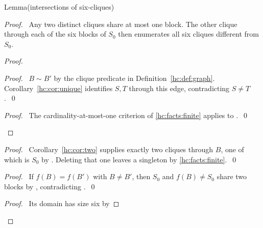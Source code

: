 \begin{mergedproofsection}
\begin{namedresult}{Lemma}{(intersections of six-cliques)}\label{hc:lem:clique-meet}
 \leavevmode\par
\end{namedresult}
\begin{proof}
 \pfsketch\ Any two distinct cliques share at most one block.
 The other clique through each of the six blocks of $S_0$ then
 enumerates all six cliques different from $S_0$.
 \begin{proof}
  \begin{proof}\pf\ $B\sim B'$ by the clique predicate in
   Definition~\ref{hc:def:graph}. Corollary~\ref{hc:cor:unique}
   identifies $S,T$ through this edge, contradicting $S\ne T$.~\qed\end{proof}
  \qedstep
  \begin{proof}\pf\ The cardinality-at-most-one criterion of
   \ref{hc:facts:finite} applies to .~\qed\end{proof}
 \end{proof}
 \begin{proof}\pf\ Corollary~\ref{hc:cor:two} supplies exactly
  two cliques through $B$, one of which is $S_0$ by .
  Deleting that one leaves a singleton by \ref{hc:facts:finite}.~\qed\end{proof}
 \begin{proof}\pf\ If $f(B)=f(B')$ with $B\ne B'$, then
  $S_0$ and $f(B)\ne S_0$ share two blocks by ,
  contradicting .~\qed\end{proof}
 \begin{proof}\pf\ Its domain has size six by

\end{proof}
\end{proof}
\end{mergedproofsection}
